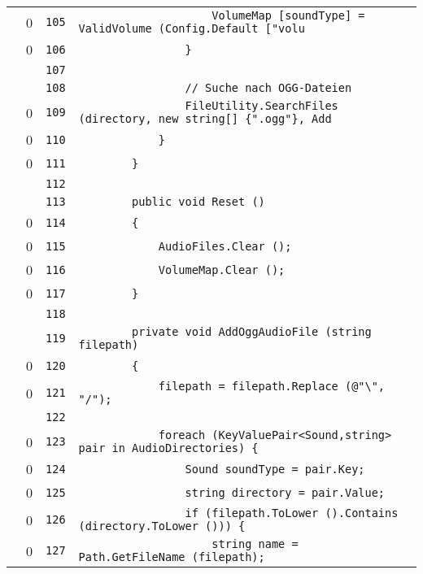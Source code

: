 \documentclass[a4paper,10pt]{article}
\begin{document}
\begin{longtable}[l]{lrrl}
\cellcolor{red} & 0 & \verb~105~ & \verb~                    VolumeMap [soundType] = ValidVolume (Config.Default ["volu~\\
\cellcolor{red} & 0 & \verb~106~ & \verb~                }~\\
\cellcolor{gray} &  & \verb~107~ & \verb~~\\
\cellcolor{gray} &  & \verb~108~ & \verb~                // Suche nach OGG-Dateien~\\
\cellcolor{red} & 0 & \verb~109~ & \verb~                FileUtility.SearchFiles (directory, new string[] {".ogg"}, Add~\\
\cellcolor{red} & 0 & \verb~110~ & \verb~            }~\\
\cellcolor{red} & 0 & \verb~111~ & \verb~        }~\\
\cellcolor{gray} &  & \verb~112~ & \verb~~\\
\cellcolor{gray} &  & \verb~113~ & \verb~        public void Reset ()~\\
\cellcolor{red} & 0 & \verb~114~ & \verb~        {~\\
\cellcolor{red} & 0 & \verb~115~ & \verb~            AudioFiles.Clear ();~\\
\cellcolor{red} & 0 & \verb~116~ & \verb~            VolumeMap.Clear ();~\\
\cellcolor{red} & 0 & \verb~117~ & \verb~        }~\\
\cellcolor{gray} &  & \verb~118~ & \verb~~\\
\cellcolor{gray} &  & \verb~119~ & \verb~        private void AddOggAudioFile (string filepath)~\\
\cellcolor{red} & 0 & \verb~120~ & \verb~        {~\\
\cellcolor{red} & 0 & \verb~121~ & \verb~            filepath = filepath.Replace (@"\", "/");~\\
\cellcolor{gray} &  & \verb~122~ & \verb~~\\
\cellcolor{red} & 0 & \verb~123~ & \verb~            foreach (KeyValuePair<Sound,string> pair in AudioDirectories) {~\\
\cellcolor{red} & 0 & \verb~124~ & \verb~                Sound soundType = pair.Key;~\\
\cellcolor{red} & 0 & \verb~125~ & \verb~                string directory = pair.Value;~\\
\cellcolor{red} & 0 & \verb~126~ & \verb~                if (filepath.ToLower ().Contains (directory.ToLower ())) {~\\
\cellcolor{red} & 0 & \verb~127~ & \verb~                    string name = Path.GetFileName (filepath);~\\

\end{longtable}
\end{document}
